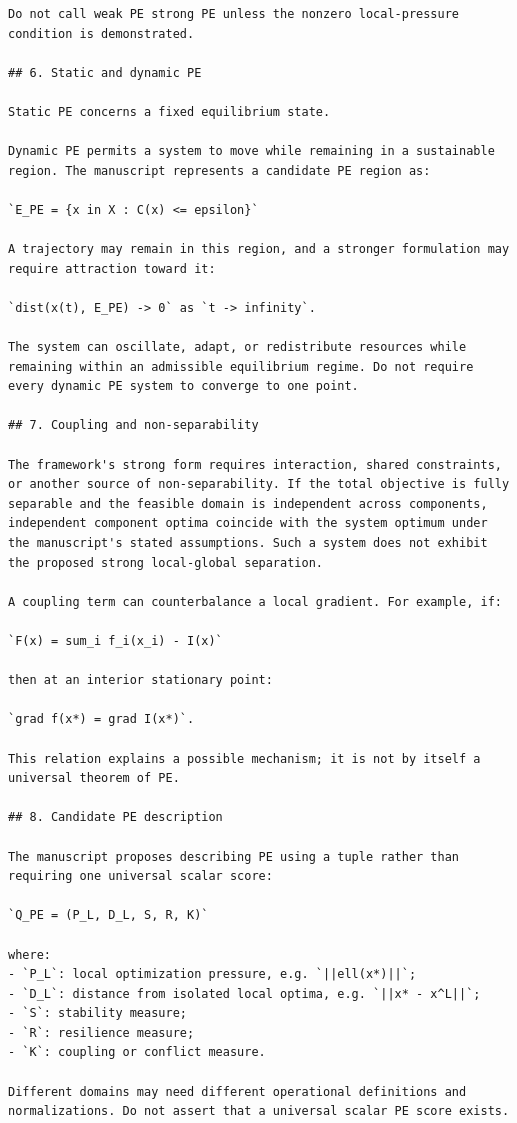 \documentclass[10pt,a4paper]{article}
\begin{document}
\begin{lstlisting}
Do not call weak PE strong PE unless the nonzero local-pressure condition is demonstrated.

## 6. Static and dynamic PE

Static PE concerns a fixed equilibrium state.

Dynamic PE permits a system to move while remaining in a sustainable region. The manuscript represents a candidate PE region as:

`E_PE = {x in X : C(x) <= epsilon}`

A trajectory may remain in this region, and a stronger formulation may require attraction toward it:

`dist(x(t), E_PE) -> 0` as `t -> infinity`.

The system can oscillate, adapt, or redistribute resources while remaining within an admissible equilibrium regime. Do not require every dynamic PE system to converge to one point.

## 7. Coupling and non-separability

The framework's strong form requires interaction, shared constraints, or another source of non-separability. If the total objective is fully separable and the feasible domain is independent across components, independent component optima coincide with the system optimum under the manuscript's stated assumptions. Such a system does not exhibit the proposed strong local-global separation.

A coupling term can counterbalance a local gradient. For example, if:

`F(x) = sum_i f_i(x_i) - I(x)`

then at an interior stationary point:

`grad f(x*) = grad I(x*)`.

This relation explains a possible mechanism; it is not by itself a universal theorem of PE.

## 8. Candidate PE description

The manuscript proposes describing PE using a tuple rather than requiring one universal scalar score:

`Q_PE = (P_L, D_L, S, R, K)`

where:
- `P_L`: local optimization pressure, e.g. `||ell(x*)||`;
- `D_L`: distance from isolated local optima, e.g. `||x* - x^L||`;
- `S`: stability measure;
- `R`: resilience measure;
- `K`: coupling or conflict measure.

Different domains may need different operational definitions and normalizations. Do not assert that a universal scalar PE score exists.


\end{lstlisting}
\end{document}
